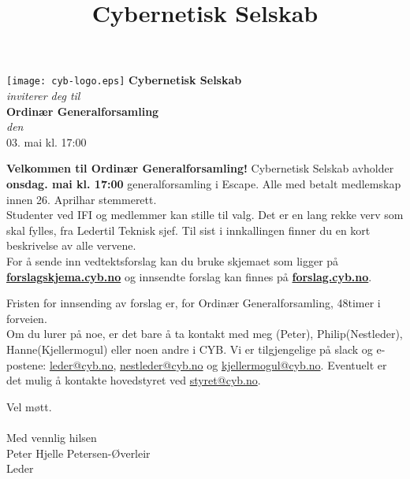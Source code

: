 \documentclass[12pt, norsk, a4paper]{proc}
\title{Cybernetisk Selskab}
\newcommand{\genforsDato}{03. mai  kl. 17:00} %
\newcommand{\genforsDag}{onsdag} %
\newcommand{\genforsDatoUkeFoer}{26. April} %
\newcommand{\generalforsamling}{Ordinær Generalforsamling} %
\newcommand{\vedtektsendringerfrist}{48} %
\newcommand{\leder}{Peter} %
\newcommand{\nestlederFornavn}{Philip} %
\newcommand{\utsendingFulltNavn}{Peter Hjelle Petersen-Øverleir} %
\newcommand{\utsendingVerv}{Leder} %
\newcommand{\mogul}{Hanne} %
\newcommand{\vervoppetilvalgEn}{Leder}
\newcommand{\vervoppetilvalgTo}{Teknisk sjef}
\begin{document}
   \begin{strip}
       \begin{center}
           \texttt{[image: cyb-logo.eps]}
            \Large\textbf{Cybernetisk Selskab}\\
            \textit{inviterer deg til}\\
            \large\textbf{\generalforsamling} \\
            \emph{den} \\
            \large \genforsDato \\
       \end{center}
   \end{strip}

\textbf{Velkommen til \generalforsamling!}
Cybernetisk Selskab avholder \textbf{\genforsDag \space \genforsDato} generalforsamling i Escape. Alle med betalt medlemskap innen \genforsDatoUkeFoer \space har stemmerett.\\

Studenter ved IFI og medlemmer kan stille til valg. Det er en lang rekke verv som skal fylles, fra \vervoppetilvalgEn \space til \vervoppetilvalgTo. Til sist i innkallingen finner du en kort beskrivelse av alle vervene.\\

For å sende inn vedtektsforslag kan du bruke skjemaet som ligger på \textbf{\href{http://forslagskjema.cyb.no/}{forslagskjema.cyb.no}} og innsendte forslag kan finnes på \textbf{\href{http://forslag.cyb.no/}{forslag.cyb.no}}.

Fristen for innsending av forslag er,  for \generalforsamling, \vedtektsendringerfrist \space timer i forveien. \\

Om du lurer på noe, er det bare å ta kontakt med meg (\leder), \nestlederFornavn \space (Nestleder), \mogul \space (Kjellermogul) eller noen andre i CYB. Vi er tilgjengelige på slack og e-postene: \href{mailto:leder@cyb.no}{leder@cyb.no}, \href{mailto:nestleder@cyb.no}{nestleder@cyb.no} og \href{mailto:kjellermogul@cyb.no}{kjellermogul@cyb.no}. Eventuelt er det mulig å kontakte hovedstyret ved \href{mailto:styret@cyb.no}{styret@cyb.no}.

Vel møtt.\\\\
Med vennlig hilsen\\
\utsendingFulltNavn\\
\utsendingVerv
\end{document}
